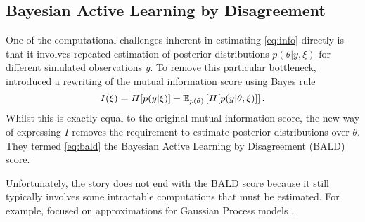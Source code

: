 \documentclass[a4paper, 10pt]{report}
\theoremstyle{plain}
\begin{document}
	
	\subsection{Bayesian Active Learning by Disagreement}
	One of the computational challenges inherent in estimating \eqref{eq:info} directly is that it involves repeated estimation of posterior distributions $p(\theta|y,\xi)$ for different simulated observations $y$.
	To remove this particular bottleneck, \citet{houlsby2011bayesian} introduced a rewriting of the mutual information score using Bayes rule
	\begin{equation}
	\label{eq:bald}
	I(\xi) = H[p(y|\xi)] - \mathbb{E}_{p(\theta)}\left[ H[p(y|\theta,\xi)] \right].
	\end{equation}
	Whilst this is exactly equal to the original mutual information score, the new way of expressing $I$ removes the requirement to estimate posterior distributions over $\theta$.
	They termed \eqref{eq:bald} the Bayesian Active Learning by Disagreement (BALD) score.
	
	Unfortunately, the story does not end with the BALD score because it still typically involves some intractable computations that must be estimated.
	For example, \citet{houlsby2011bayesian} focused on approximations for Gaussian Process models \citep{williams2006gaussian}.
	
\end{document}
